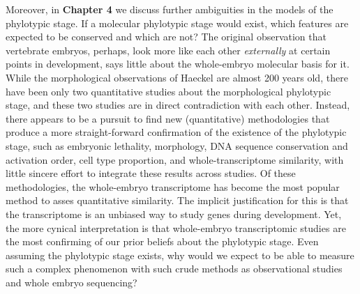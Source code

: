 Moreover, in \textbf{Chapter 4} we discuss further ambiguities in the models of the phylotypic stage. If a molecular phylotypic stage would exist, which features are expected to be conserved and which are not? The original observation that vertebrate embryos, perhaps, look more like each other \textit{externally} at certain points in development, says little about the whole-embryo molecular basis for it. While the morphological observations of Haeckel are almost 200 years old, there have been only two quantitative studies about the morphological phylotypic stage, and these two studies are in direct contradiction with each other. Instead, there appears to be a pursuit to find new (quantitative) methodologies that produce a more straight-forward confirmation of the existence of the phylotypic stage, such as embryonic lethality\cite{Uchida2018}, morphology\cite{OlafRP2003,Cordero2020}, DNA sequence conservation\cite{Piasecka2013,Quint2012,Liu2021} and activation order\cite{Uesaka2019}, cell type proportion\cite{Mayshar2023}, and whole-transcriptome similarity\cite{Piasecka2013,Irie2011,marletaz2018,Liu2020,Leong2021,PerezPosada2022,Kalinka2010}, with little sincere effort to integrate these results across studies. Of these methodologies, the whole-embryo transcriptome has become the most popular method to asses quantitative similarity. The implicit justification for this is that the transcriptome is an unbiased way to study genes during development. Yet, the more cynical interpretation is that whole-embryo transcriptomic studies are the most confirming of our prior beliefs about the phylotypic stage. Even assuming the phylotypic stage exists, why would we expect to be able to measure such a complex phenomenon with such crude methods as observational studies and whole embryo sequencing? 

